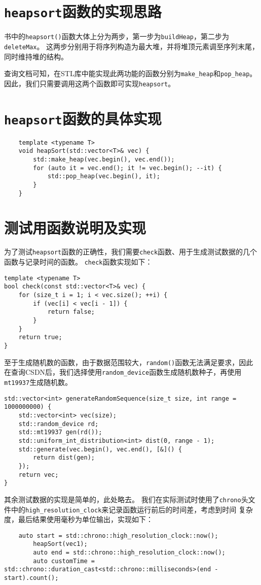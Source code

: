 \documentclass[UTF8]{ctexart}
\begin{document}
\pagestyle{fancy}
\fancyhead{}
\rhead{\today}

\section{\texttt{heapsort}函数的实现思路}
    书中的\texttt{heapsort()}函数大体上分为两步，第一步为\texttt{buildHeap}，第二步为\texttt{deleteMax}。
    这两步分别用于将序列构造为最大堆，并将堆顶元素调至序列末尾，同时维持堆的结构。\par
    查询文档可知，在STL库中能实现此两功能的函数分别为\texttt{make\_heap}和\texttt{pop\_heap}。因此，我们只需要调用这两个函数即可实现\texttt{heapsort}。
\section{\texttt{heapsort}函数的具体实现}
    \begin{lstlisting}
    template <typename T>
    void heapSort(std::vector<T>& vec) {
        std::make_heap(vec.begin(), vec.end());  
        for (auto it = vec.end(); it != vec.begin(); --it) {
            std::pop_heap(vec.begin(), it);
        }
    }
    \end{lstlisting}
\section{测试用函数说明及实现}
    为了测试\texttt{heapsort}函数的正确性，我们需要\texttt{check}函数、用于生成测试数据的几个函数与记录时间的函数。
    \texttt{check}函数实现如下：
    \begin{lstlisting}
template <typename T>
bool check(const std::vector<T>& vec) {
    for (size_t i = 1; i < vec.size(); ++i) {
        if (vec[i] < vec[i - 1]) { 
            return false;
        }
    }
    return true;
}
\end{lstlisting}
    至于生成随机数的函数，由于数据范围较大，\texttt{random()}函数无法满足要求，因此
    在查询CSDN后，我们选择使用\texttt{random\_device}函数生成随机数种子，再使用\texttt{mt19937}生成随机数。
    \begin{lstlisting}
std::vector<int> generateRandomSequence(size_t size, int range = 1000000000) {
    std::vector<int> vec(size);
    std::random_device rd;                                 
    std::mt19937 gen(rd());                                
    std::uniform_int_distribution<int> dist(0, range - 1); 
    std::generate(vec.begin(), vec.end(), [&]() {          
        return dist(gen);
    });
    return vec;
}
    \end{lstlisting}
其余测试数据的实现是简单的，此处略去。
我们在实际测试时使用了\texttt{chrono}头文件中的\texttt{high\_resolution\_clock}来记录函数运行前后的时间差，考虑到时间
复杂度，最后结果使用毫秒为单位输出，实现如下：
\begin{lstlisting}
    auto start = std::chrono::high_resolution_clock::now();
        heapSort(vec1);
        auto end = std::chrono::high_resolution_clock::now();
        auto customTime = std::chrono::duration_cast<std::chrono::milliseconds>(end - start).count();
\end{lstlisting}
\end{document}
